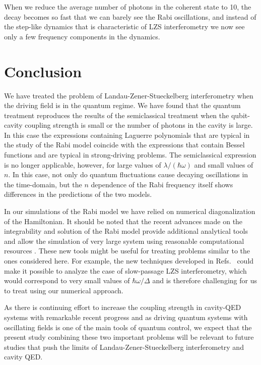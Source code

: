 \documentclass[aps,twocolumn,superscriptaddress]{revtex4}
\begin{document}
When we reduce the average number of photons in the coherent state to 10, the decay becomes so fast that we can barely see the Rabi oscillations, and instead of the step-like dynamics that is characteristic of LZS interferometry we now see only a few frequency components in the dynamics.



\section{Conclusion}
\label{Sec:Conclusion}

We have treated the problem of Landau-Zener-Stueckelberg interferometry when the driving field is in the quantum regime. We have found that the quantum treatment reproduces the results of the semiclassical treatment when the qubit-cavity coupling strength is small or the number of photons in the cavity is large. In this case the expressions containing Laguerre polynomials that are typical in the study of the Rabi model coincide with the expressions that contain Bessel functions and are typical in strong-driving problems. The semiclassical expression is no longer applicable, however, for large values of $\lambda/(\hbar\omega)$ and small values of $n$. In this case, not only do quantum fluctuations cause decaying oscillations in the time-domain, but the $n$ dependence of the Rabi frequency itself shows differences in the predictions of the two models.

In our simulations of the Rabi model we have relied on numerical diagonalization of the Hamiltonian. It should be noted that the recent advances made on the integrability and solution of the Rabi model provide additional analytical tools and allow the simulation of very large system using reasonable computational resources \cite{Braak,Zhang,Chen,Zhong}. These new tools might be useful for treating problems similar to the ones considered here. For example, the new techniques developed in Refs.~\cite{Braak,Zhang,Chen,Zhong} could make it possible to analyze the case of slow-passage LZS interferometry, which would correspond to very small values of $\hbar\omega/\Delta$ and is therefore challenging for us to treat using our numerical approach.

As there is continuing effort to increase the coupling strength in cavity-QED systems with remarkable recent progress and as driving quantum systems with oscillating fields is one of the main tools of quantum control, we expect that the present study combining these two important problems will be relevant to future studies that push the limits of Landau-Zener-Stueckelberg interferometry and cavity QED.
\end{document}
